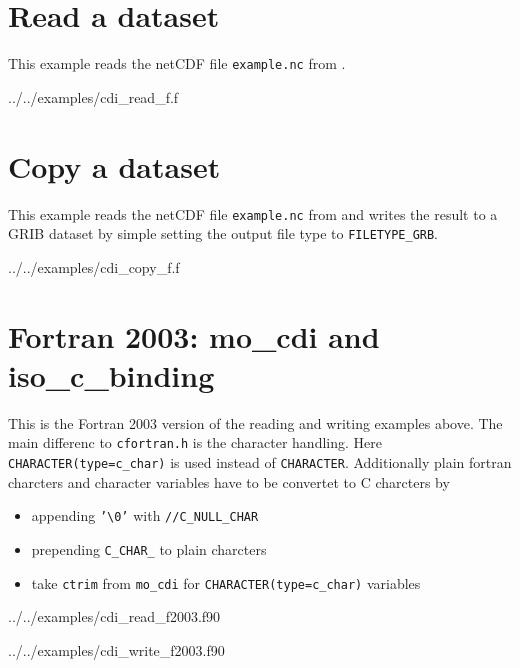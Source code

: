 \section{\label{example_read}Read a dataset}

This example reads the netCDF file {\tt example.nc} from .


{../../examples/cdi_read_f.f}


\section{Copy a dataset}

This example reads the netCDF file {\tt example.nc} from 
and writes the result to a GRIB dataset by simple setting the output file type
to {\tt FILETYPE\_GRB}.


{../../examples/cdi_copy_f.f}

\section{\label{examples_f2003}Fortran 2003: mo\_cdi and iso\_c\_binding}

This is the Fortran 2003 version of the reading and writing examples above.
The main differenc to {\tt cfortran.h} is the
character handling. Here {\tt CHARACTER(type=c\_char)} is used instead of
{\tt CHARACTER}. Additionally plain fortran charcters and character variables
have to be convertet to C charcters by
\begin{itemize}
\item appending {\tt '\textbackslash 0'} with {\tt //C\_NULL\_CHAR} 
\item prepending {\tt C\_CHAR\_} to plain charcters
\item take {\tt ctrim} from {\tt mo\_cdi} for {\tt CHARACTER(type=c\_char)} variables
\end{itemize}


{../../examples/cdi_read_f2003.f90}


{../../examples/cdi_write_f2003.f90}
